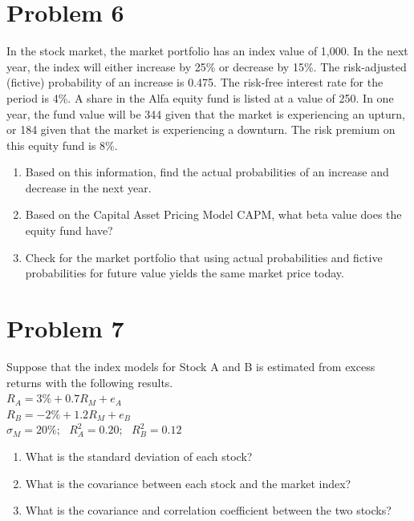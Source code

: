 \documentclass[12]{article}
\begin{document}
\color{black}
\section*{Problem 6}
In the stock market, the market portfolio has an index value of 1,000. In the next year, the index will either increase by 25\% or decrease by 15\%. The risk-adjusted (fictive) probability of an increase is 0.475. The risk-free interest rate for the period is 4\%. A share in the Alfa equity fund is listed at a value of 250. In one year, the fund value will be 344 given that the market is experiencing an upturn, or 184 given that the market is experiencing a downturn. The risk premium on this equity fund is 8\%.
\begin{enumerate}
    \item[a.]  Based on this information, find the actual probabilities of an increase and decrease in the next year.
    \item[b.]  Based on the Capital Asset Pricing Model CAPM, what beta value does the equity fund have?
    \item[c.]  Check for the market portfolio that using actual probabilities and fictive probabilities for future value yields the same market price today.
\end{enumerate}





\color{black}
\section*{Problem 7}
Suppose that the index models for Stock A and B is estimated from excess returns with the following results.\\
$R_A = 3\% + 0.7R_M + e_A$\\
$R_B = -2\% + 1.2R_M + e_B$\\
$\sigma_M = 20\%;\text{  } R_A^2 = 0.20;\text{  } R_B^2 = 0.12 $

\begin{enumerate}
    \item[a)] What is the standard deviation of each stock?
    \item[b)] What is the covariance between each stock and the market index?
    \item[c)] What is the covariance and correlation coefficient between the two stocks? 
\end{enumerate}
\end{document}
